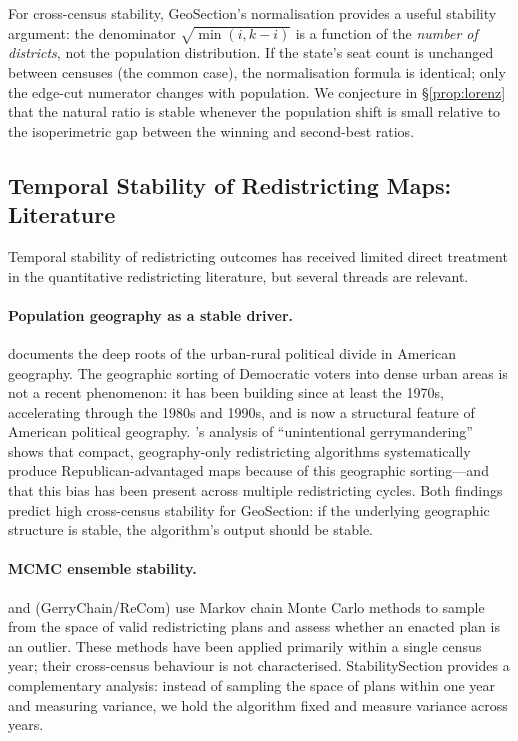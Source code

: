 For cross-census stability, GeoSection's normalisation provides a useful
stability argument: the denominator $\sqrt{\min(i,k-i)}$ is a function of
the \emph{number of districts}, not the population distribution.
If the state's seat count is unchanged between censuses (the common case), the
normalisation formula is identical; only the edge-cut numerator changes with
population.
We conjecture in \S\ref{prop:lorenz} that the natural ratio is stable whenever the
population shift is small relative to the isoperimetric gap between the winning
and second-best ratios.

\subsection{Temporal Stability of Redistricting Maps: Literature}

Temporal stability of redistricting outcomes has received limited direct
treatment in the quantitative redistricting literature, but several threads
are relevant.

\paragraph{Population geography as a stable driver.}
\citet{rodden2019} documents the deep roots of the urban-rural political
divide in American geography.
The geographic sorting of Democratic voters into dense urban areas is not a
recent phenomenon: it has been building since at least the 1970s, accelerating
through the 1980s and 1990s, and is now a structural feature of American
political geography.
\citet{chen2013}'s analysis of ``unintentional gerrymandering'' shows that
compact, geography-only redistricting algorithms systematically produce
Republican-advantaged maps because of this geographic sorting---and that this
bias has been present across multiple redistricting cycles.
Both findings predict high cross-census stability for GeoSection: if the
underlying geographic structure is stable, the algorithm's output should be
stable.

\paragraph{MCMC ensemble stability.}
\citet{chikina2017} and \citet{deford2019} (GerryChain/ReCom) use Markov chain
Monte Carlo methods to sample from the space of valid redistricting plans and
assess whether an enacted plan is an outlier.
These methods have been applied primarily within a single census year; their
cross-census behaviour is not characterised.
StabilitySection provides a complementary analysis: instead of sampling the
space of plans within one year and measuring variance, we hold the algorithm
fixed and measure variance across years.

